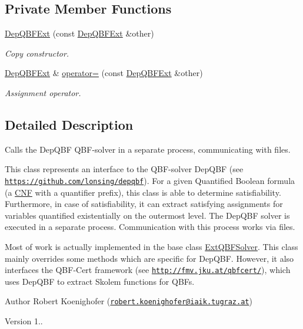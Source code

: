 \subsection*{Private Member Functions}
\begin{DoxyCompactItemize}
\item 
\hyperlink{classDepQBFExt_ae711230c91a8990450466d085a34bcc2}{Dep\-Q\-B\-F\-Ext} (const \hyperlink{classDepQBFExt}{Dep\-Q\-B\-F\-Ext} \&other)
\begin{DoxyCompactList}\small\item\em Copy constructor. \end{DoxyCompactList}\item 
\hyperlink{classDepQBFExt}{Dep\-Q\-B\-F\-Ext} \& \hyperlink{classDepQBFExt_a25779db93932e28f4f7cbddaa8636fdb}{operator=} (const \hyperlink{classDepQBFExt}{Dep\-Q\-B\-F\-Ext} \&other)
\begin{DoxyCompactList}\small\item\em Assignment operator. \end{DoxyCompactList}\end{DoxyCompactItemize}


\subsection{Detailed Description}
Calls the Dep\-Q\-B\-F Q\-B\-F-\/solver in a separate process, communicating with files. 

This class represents an interface to the Q\-B\-F-\/solver Dep\-Q\-B\-F (see \href{https://github.com/lonsing/depqbf}{\tt https\-://github.\-com/lonsing/depqbf}). For a given Quantified Boolean formula (a \hyperlink{classCNF}{C\-N\-F} with a quantifier prefix), this class is able to determine satisfiability. Furthermore, in case of satisfiability, it can extract satisfying assignments for variables quantified existentially on the outermost level. The Dep\-Q\-B\-F solver is executed in a separate process. Communication with this process works via files.

Most of work is actually implemented in the base class \hyperlink{classExtQBFSolver}{Ext\-Q\-B\-F\-Solver}. This class mainly overrides some methods which are specific for Dep\-Q\-B\-F. However, it also interfaces the Q\-B\-F-\/\-Cert framework (see \href{http://fmv.jku.at/qbfcert/}{\tt http\-://fmv.\-jku.\-at/qbfcert/}), which uses Dep\-Q\-B\-F to extract Skolem functions for Q\-B\-Fs.

\begin{DoxyAuthor}{Author}
Robert Koenighofer (\href{mailto:robert.koenighofer@iaik.tugraz.at}{\tt robert.\-koenighofer@iaik.\-tugraz.\-at}) 
\end{DoxyAuthor}
\begin{DoxyVersion}{Version}
1.. 
\end{DoxyVersion}


